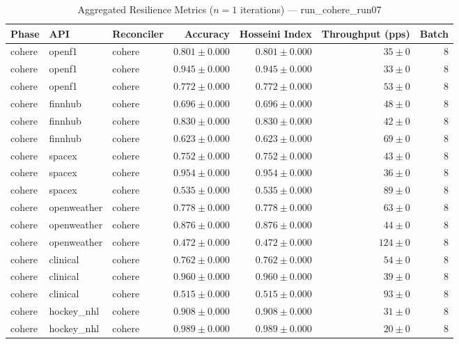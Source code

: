 
\begin{table}[htbp]
\caption{Aggregated Resilience Metrics ($n=1$ iterations) --- run_cohere_run07}
\begin{tabular}{l l l r r r r}
\hline
Phase & API & Reconciler & Accuracy & Hosseini Index & Throughput (pps) & Batch \\
\hline
cohere & openf1 & cohere & $0.801\pm0.000$ & $0.801\pm0.000$ & $35\pm0$ & 8 \\
cohere & openf1 & cohere & $0.945\pm0.000$ & $0.945\pm0.000$ & $33\pm0$ & 8 \\
cohere & openf1 & cohere & $0.772\pm0.000$ & $0.772\pm0.000$ & $53\pm0$ & 8 \\
cohere & finnhub & cohere & $0.696\pm0.000$ & $0.696\pm0.000$ & $48\pm0$ & 8 \\
cohere & finnhub & cohere & $0.830\pm0.000$ & $0.830\pm0.000$ & $42\pm0$ & 8 \\
cohere & finnhub & cohere & $0.623\pm0.000$ & $0.623\pm0.000$ & $69\pm0$ & 8 \\
cohere & spacex & cohere & $0.752\pm0.000$ & $0.752\pm0.000$ & $43\pm0$ & 8 \\
cohere & spacex & cohere & $0.954\pm0.000$ & $0.954\pm0.000$ & $36\pm0$ & 8 \\
cohere & spacex & cohere & $0.535\pm0.000$ & $0.535\pm0.000$ & $89\pm0$ & 8 \\
cohere & openweather & cohere & $0.778\pm0.000$ & $0.778\pm0.000$ & $63\pm0$ & 8 \\
cohere & openweather & cohere & $0.876\pm0.000$ & $0.876\pm0.000$ & $44\pm0$ & 8 \\
cohere & openweather & cohere & $0.472\pm0.000$ & $0.472\pm0.000$ & $124\pm0$ & 8 \\
cohere & clinical & cohere & $0.762\pm0.000$ & $0.762\pm0.000$ & $54\pm0$ & 8 \\
cohere & clinical & cohere & $0.960\pm0.000$ & $0.960\pm0.000$ & $39\pm0$ & 8 \\
cohere & clinical & cohere & $0.515\pm0.000$ & $0.515\pm0.000$ & $93\pm0$ & 8 \\
cohere & hockey\_nhl & cohere & $0.908\pm0.000$ & $0.908\pm0.000$ & $31\pm0$ & 8 \\
cohere & hockey\_nhl & cohere & $0.989\pm0.000$ & $0.989\pm0.000$ & $20\pm0$ & 8 \\

\end{tabular}
\end{table}
